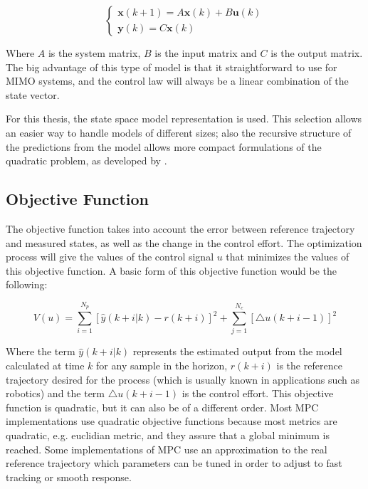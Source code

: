 \begin{itemize}
\begin{equation} \label{statespacemodel1}
\begin{cases} \mathbf{x}(k + 1) = A\mathbf{x}(k) + B\mathbf{u}(k) \\ \mathbf{y}(k) = C\mathbf{x}(k)
\end{cases}
\end{equation}

Where $A$ is the system matrix, $B$ is the input matrix and $C$ is the output matrix. The big advantage of this type of model is that it straightforward to use for MIMO systems, and the control law will always be a linear combination of the state vector. 

\end{itemize}

For this thesis, the state space model representation is used. This selection allows an easier way to handle models of different sizes; also the recursive structure of the predictions from the model allows more compact formulations of the quadratic problem, as developed by \cite{Ferreau2006}.


 
\subsection{Objective Function}%

The objective function takes into account the error between reference trajectory and measured states, as well as the change in the control effort. The optimization process will give the values of the control signal $u$ that minimizes the values of this objective function. A basic form of this objective function would be the following:

\begin{equation} \label{objectivefunction1}
V(u) = \sum_{i=1}^{N_{p}}  [\hat{y}(k + i | k) - r(k + i)]^2 + \sum_{j=1}^{N_{c}} [\triangle u(k + i - 1)]^2
\end{equation}

Where the term $\hat{y}(k + i | k)$ represents the estimated output from the model calculated at time $k$ for any sample in the horizon, $r(k + i)$ is the reference trajectory desired for the process (which is usually known in applications such as robotics) and the term $\triangle u(k + i - 1)$ is the control effort. This objective function is quadratic, but it can also be of a different order. Most MPC implementations use quadratic objective functions because most metrics are quadratic, e.g. euclidian metric, and they assure that a global minimum is reached. Some implementations of MPC use an approximation to the real reference trajectory which parameters can be tuned in order to adjust to fast tracking or smooth response.\\ 

